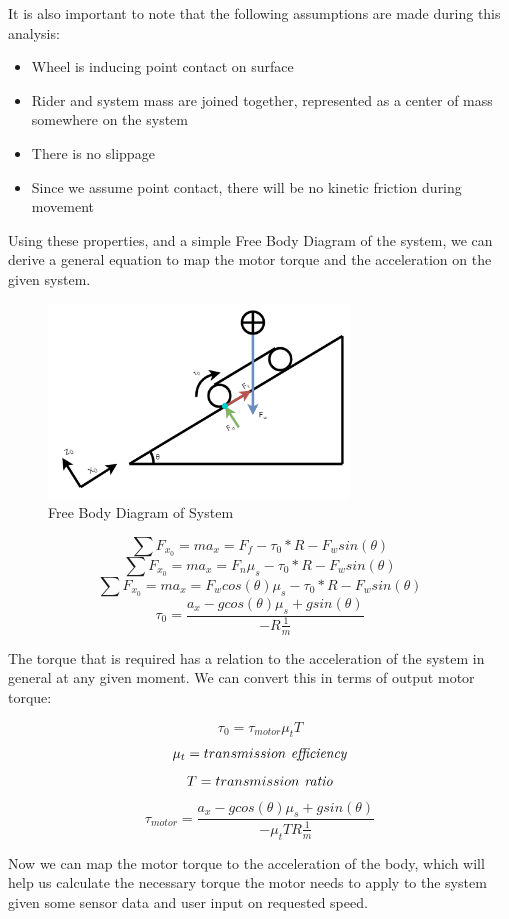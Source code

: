 \documentclass[titlepage, letterpaper,12pt]{article}
\begin{document}
It is also important to note that the following assumptions are made during this analysis:
\begin{itemize}
    \item Wheel is inducing point contact on surface
    \item Rider and system mass are joined together, represented as a center of mass somewhere on the system
    \item There is no slippage
    \item Since we assume point contact, there will be no kinetic friction during movement
\end{itemize}

Using these properties, and a simple Free Body Diagram of the system, we can derive a general equation to map the motor torque and the acceleration on the given system.

\begin{figure}[h]
\caption{Free Body Diagram of System}
\includegraphics[width=8cm]{figs/FBD_MESB.png}
\centering
\end{figure}

\[\sum F _{x _{0}} = ma _x = F _f - \tau _{0} * R - F _wsin(\theta )\]
\[\sum F _{x _{0}} = ma _x = F _n \mu _s - \tau _{0} * R - F _wsin(\theta )\]
\[\sum F _{x _{0}} = ma _x = F _wcos(\theta) \mu _s - \tau _{0} * R - F _wsin(\theta )\]
\[\tau _{0} = \frac{a _x - gcos(\theta)\mu _s + gsin(\theta)}{-R \frac{1}{m}}\]

The torque that is required has a relation to the acceleration of the system in general at any given moment. We can convert this in terms of output motor torque:

\[\tau _0 = \tau _{motor}\mu_tT\]
\[\mu_t = transmission  \emph{ efficiency}\]
\[T = transmission \emph{ ratio}\]
\begin{equation} \label{eq:1}
    \tau _{motor} = \frac{a _x - gcos(\theta)\mu _s + gsin(\theta)}{-\mu_t T R \frac{1}{m}}
\end{equation}

Now we can map the motor torque to the acceleration of the body, which will help us calculate the necessary torque the motor needs to apply to the system given some sensor data and user input on requested speed.
\end{document}
